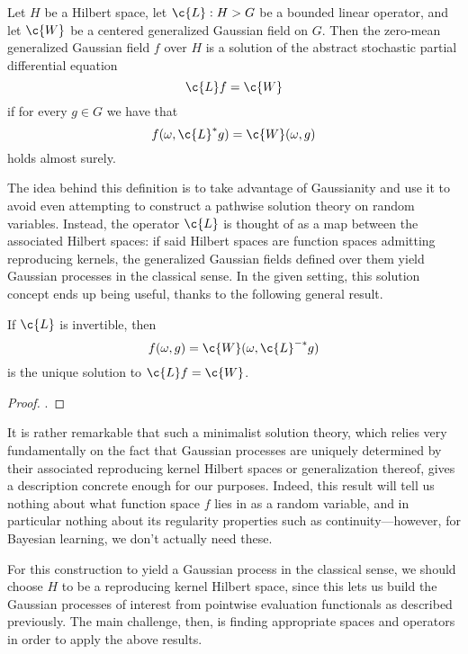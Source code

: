 \documentclass[11pt]{book}
\begin{document}
\begin{definition}
Let $H$ be a Hilbert space, let $\c{L} : H \-> G$ be a bounded linear operator, and let $\c{W}$ be a centered generalized Gaussian field on $G$.
Then the zero-mean generalized Gaussian field $f$ over $H$ is a solution of the abstract stochastic partial differential equation 
\[
\c{L} f = \c{W}    
\]
if for every $g\in G$ we have that 
\[
f(\omega,\c{L}^* g) = \c{W}(\omega,g)
\]
holds almost surely.
\end{definition}

The idea behind this definition is to take advantage of Gaussianity and use it to avoid even attempting to construct a pathwise solution theory on random variables.
Instead, the operator $\c{L}$ is thought of as a map between the associated Hilbert spaces: if said Hilbert spaces are function spaces admitting reproducing kernels, the generalized Gaussian fields defined over them yield Gaussian processes in the classical sense.
In the given setting, this solution concept ends up being useful, thanks to the following general result.

\begin{result}
If $\c{L}$ is invertible, then
\[
f(\omega,g) = \c{W}(\omega, \c{L}^{-*} g)
\]
is the unique solution to $\c{L}f = \c{W}$.
\end{result}

\begin{proof}
\textcite[Theorem 4.2.2.]{lototsky17}.
\end{proof}

It is rather remarkable that such a minimalist solution theory, which relies very fundamentally on the fact that Gaussian processes are uniquely determined by their associated reproducing kernel Hilbert spaces or generalization thereof, gives a description concrete enough for our purposes.
Indeed, this result will tell us nothing about what function space $f$ lies in as a random variable, and in particular nothing about its regularity properties such as continuity---however, for Bayesian learning, we don't actually need these.

For this construction to yield a Gaussian process in the classical sense, we should choose $H$ to be a reproducing kernel Hilbert space, since this lets us build the Gaussian processes of interest from pointwise evaluation functionals as described previously.
The main challenge, then, is finding appropriate spaces and operators in order to apply the above results.
\end{document}
